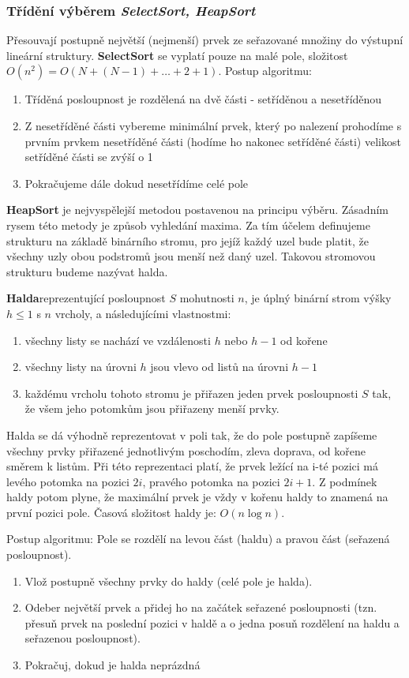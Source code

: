 \subsubsection{Třídění výběrem \textit{SelectSort, HeapSort}}
Přesouvají postupně největší (nejmenší) prvek ze seřazované množiny do výstupní lineární struktury. 
\textbf{SelectSort} se vyplatí pouze na malé pole, složitost $O(n^2) = O(N+(N-1)+\ldots + 2 + 1)$. Postup algoritmu:
\begin{enumerate}
\item Tříděná posloupnost je rozdělená na dvě části - setříděnou a nesetříděnou
\item Z nesetříděné části vybereme minimální prvek, který po nalezení prohodíme s prvním prvkem nesetříděné části (hodíme ho nakonec setříděné části) velikost setříděné části se zvýší o 1
\item Pokračujeme dále dokud nesetřídíme celé pole
\end{enumerate}

\textbf{HeapSort} je nejvyspělejší metodou postavenou na principu výběru. Zásadním rysem této metody je způsob vyhledání maxima. Za tím účelem definujeme strukturu na základě binárního stromu, pro jejíž každý uzel bude platit, že všechny uzly obou podstromů jsou menší než daný uzel. Takovou stromovou strukturu budeme nazývat halda.

\textbf{Halda}reprezentující posloupnost $S$ mohutnosti $n$, je úplný binární strom výšky $h \leq 1$ s $n$ vrcholy, a následujícími vlastnostmi:
\begin{enumerate}
\item všechny listy se nachází ve vzdálenosti $h$ nebo $h-1$ od kořene
\item všechny listy na úrovni $h$ jsou vlevo od listů na úrovni $h-1$
\item každému vrcholu tohoto stromu je přiřazen jeden prvek posloupnosti $S$ tak, že všem jeho potomkům jsou přiřazeny menší prvky.
\end{enumerate}
Halda se dá výhodně reprezentovat v poli tak, že do pole postupně zapíšeme všechny prvky přiřazené jednotlivým poschodím, zleva doprava, od kořene směrem k listům. Při této reprezentaci platí, že prvek ležící na  i-té pozici má levého potomka na pozici $2i$, pravého potomka na pozici $2i+1$. Z podmínek haldy potom plyne, že maximální prvek je vždy v kořenu haldy to znamená na první pozici pole. Časová složitost haldy je: $O(n \log n)$.

Postup algoritmu: Pole se rozdělí na levou část (haldu) a pravou část (seřazená posloupnost).
\begin{enumerate}
\item Vlož postupně všechny prvky do haldy (celé pole je halda).
\item Odeber největší prvek a přidej ho na začátek seřazené posloupnosti (tzn. přesuň prvek na poslední pozici v haldě a o jedna posuň rozdělení na haldu a seřazenou posloupnost).
\item Pokračuj, dokud je halda neprázdná
\end{enumerate}

